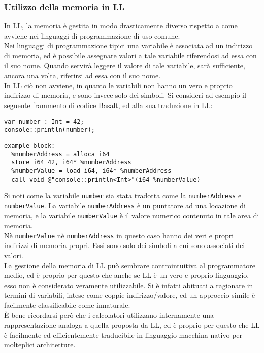 \subsubsection{Utilizzo della memoria in LL}
In LL, la memoria è gestita in modo drasticamente diverso rispetto 
a come avviene nei linguaggi di programmazione di uso comune. \\ 

Nei linguaggi di programmazione tipici una variabile è associata ad un indirizzo 
di memoria, ed è possibile assegnare valori a tale variabile riferendosi ad essa con il suo nome. Quando 
servirà leggere il valore di tale variabile, sarà sufficiente, ancora una volta, riferirsi ad essa 
con il suo nome. \\

In LL ciò non avviene, in quanto le variabili non hanno un vero e proprio indirizzo di memoria, 
e sono invece solo dei simboli. Si consideri ad esempio il seguente frammento di codice Basalt, 
ed alla sua traduzione in LL:

\vspace{0.5cm}
\begin{lstlisting}[frame=single]
var number : Int = 42;
console::println(number);
\end{lstlisting}

\begin{lstlisting}[frame=single]
example_block:
  %numberAddress = alloca i64
  store i64 42, i64* %numberAddress
  %numberValue = load i64, i64* %numberAddress
  call void @"console::println<Int>"(i64 %numberValue)
\end{lstlisting}
\vspace{0.5cm}

Si noti come la variabile \texttt{number} sia stata tradotta come la \texttt{numberAddress} e \texttt{numberValue}.
La variabile \texttt{numberAddress} è un puntatore ad una locazione di memoria, e la variabile \texttt{numberValue}
è il valore numerico contenuto in tale area di memoria. \\

Nè \texttt{numberValue} nè \texttt{numberAddress} in 
questo caso hanno dei veri e propri indirizzi di memoria propri. Essi sono solo dei simboli 
a cui sono associati dei valori. \\

La gestione della memoria di LL può sembrare controintuitiva al programmatore medio, ed è proprio per questo 
che anche se LL è un vero e proprio linguaggio, esso non è considerato veramente utilizzabile. Si è infatti abituati
a ragionare in termini di variabili, intese come coppie indirizzo/valore, ed un approccio simile è facilmente 
classificabile come innaturale. \\

È bene ricordarsi però che i calcolatori utilizzano internamente una rappresentazione 
analoga a quella proposta da LL, ed è proprio per questo che LL è facilmente ed efficientemente traducibile 
in linguaggio macchina nativo per molteplici architetture. \\